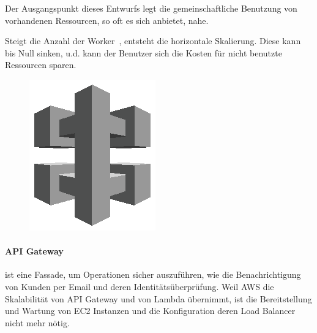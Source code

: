 \documentclass[
12pt,
english,
ngerman,
headsepline,
twoside,
openright,
numbers=noenddot,version=first
]{scrreprt}
\begin{document}
Der Ausgangspunkt dieses Entwurfs legt die gemeinschaftliche Benutzung von vorhandenen Ressourcen, so oft es sich anbietet, nahe.

Steigt die Anzahl der \glqq Worker\grqq\ , entsteht die horizontale Skalierung. Diese kann bis Null sinken, u.d. kann der Benutzer sich die Kosten für nicht benutzte Ressourcen sparen.  


\begin{figure}
	\includegraphics[width=0.9\linewidth]{./pics/aws/MobileServices_GRAYSCALE_AmazonAPIGateway.eps}
\end{figure}
\paragraph{API Gateway} ist eine Fassade, um Operationen sicher auszuführen, wie die Benachrichtigung von Kunden per Email und deren Identitätsüberprüfung. Weil AWS die Skalabilität von API Gateway und von Lambda übernimmt, ist die Bereitstellung und Wartung von EC2 Instanzen und die Konfiguration deren Load Balancer nicht mehr nötig. 
\end{document}
